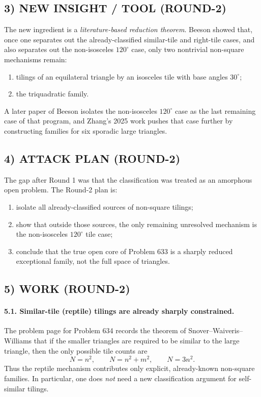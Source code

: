 \subsection*{3) NEW INSIGHT / TOOL (ROUND-2)}
The new ingredient is a \emph{literature-based reduction theorem}. Beeson showed that, once one separates out the already-classified similar-tile and right-tile cases, and also separates out the non-isosceles $120^\circ$ case, only two nontrivial non-square mechanisms remain:
\begin{enumerate}
\item tilings of an equilateral triangle by an isosceles tile with base angles $30^\circ$;
\item the triquadratic family.
\end{enumerate}
A later paper of Beeson isolates the non-isosceles $120^\circ$ case as the last remaining case of that program, and Zhang's 2025 work pushes that case further by constructing families for six sporadic large triangles.

\subsection*{4) ATTACK PLAN (ROUND-2)}
The gap after Round 1 was that the classification was treated as an amorphous open problem. The Round-2 plan is:
\begin{enumerate}
\item isolate all already-classified sources of non-square tilings;
\item show that outside those sources, the only remaining unresolved mechanism is the non-isosceles $120^\circ$ tile case;
\item conclude that the true open core of Problem 633 is a sharply reduced exceptional family, not the full space of triangles.
\end{enumerate}

\subsection*{5) WORK (ROUND-2)}
\paragraph{5.1. Similar-tile (reptile) tilings are already sharply constrained.}
The problem page for Problem 634 records the theorem of Snover--Waiveris--Williams that if the smaller triangles are required to be similar to the large triangle, then the only possible tile counts are
\[
N=n^2,\qquad N=n^2+m^2,\qquad N=3n^2.
\]
Thus the reptile mechanism contributes only explicit, already-known non-square families. In particular, one does \emph{not} need a new classification argument for self-similar tilings.

